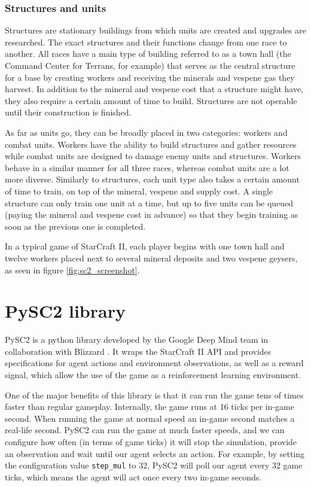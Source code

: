 \subsubsection{Structures and units}

Structures are stationary buildings from which units are created and upgrades are researched. The exact structures and their functions change from one race to another. All races have a main type of building referred to as a town hall (the Command Center for Terrans, for example) that serves as the central structure for a base by creating workers and receiving the minerals and vespene gas they harvest. In addition to the mineral and vespene cost that a structure might have, they also require a certain amount of time to build. Structures are not operable until their construction is finished.

As far as units go, they can be broadly placed in two categories: workers and combat units. Workers have the ability to build structures and gather resources while combat units are designed to damage enemy units and structures. Workers behave in a similar manner for all three races, whereas combat units are a lot more diverse. Similarly to structures, each unit type also takes a certain amount of time to train, on top of the mineral, vespene and supply cost. A single structure can only train one unit at a time, but up to five units can be queued (paying the mineral and vespene cost in advance) so that they begin training as soon as the previous one is completed.

In a typical game of StarCraft II, each player begins with one town hall and twelve workers placed next to several mineral deposits and two vespene geysers, as seen in figure \ref{fig:sc2_screenshot}.

\section{PySC2 library}
\label{sec:pysc2}

PySC2 is a python library developed by the Google Deep Mind team in collaboration with Blizzard \cite{Vinyals:2017}. It wraps the StarCraft II API and provides specifications for agent actions and environment observations, as well as a reward signal, which allow the use of the game as a reinforcement learning environment.

One of the major benefits of this library is that it can run the game tens of times faster than regular gameplay. Internally, the game runs at 16 ticks per in-game second. When running the game at normal speed an in-game second matches a real-life second. PySC2 can run the game at much faster speeds, and we can configure how often (in terms of game ticks) it will stop the simulation, provide an observation and wait until our agent selects an action. For example, by setting the configuration value \texttt{step\_mul} to 32, PySC2 will poll our agent every 32 game ticks, which means the agent will act once every two in-game seconds.

